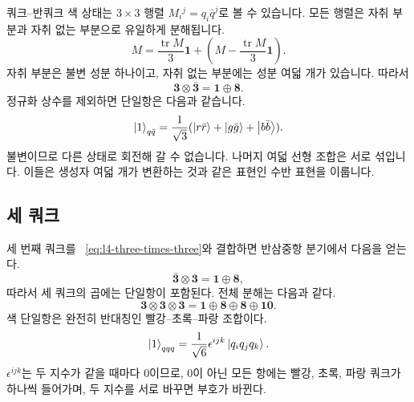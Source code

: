 쿼크--반쿼크 색 상태는 \(3\times3\) 행렬 \(M_i{}^j=q_i\bar q^j\)로 볼 수 있습니다. 모든 행렬은 자취 부분과 자취 없는 부분으로 유일하게 분해됩니다.
\begin{equation}
M=\frac{\operatorname{tr}M}{3}\boldsymbol 1
+\left(M-\frac{\operatorname{tr}M}{3}\boldsymbol 1\right).
\end{equation}
자취 부분은 불변 성분 하나이고, 자취 없는 부분에는 성분 여덟 개가 있습니다. 따라서
\begin{equation}
\boldsymbol 3\otimes\bar{\boldsymbol 3}
=\boldsymbol 1\oplus\boldsymbol 8.
\label{eq:l4-three-times-threebar}
\end{equation}
정규화 상수를 제외하면 단일항은 다음과 같습니다.
\begin{equation}
\left\lvert1\right\rangle_{q\bar q}
=\frac{1}{\sqrt3}
(\left\lvert r\bar r\right\rangle+\left\lvert g\bar g\right\rangle+\left\lvert b\bar b\right\rangle).
\end{equation}
불변이므로 다른 상태로 회전해 갈 수 없습니다. 나머지 여덟 선형 조합은 서로 섞입니다. 이들은 생성자 여덟 개가 변환하는 것과 같은 표현인 수반 표현을 이룹니다.

\subsection{세 쿼크}

세 번째 쿼크를 ~\eqref{eq:l4-three-times-three}와 결합하면 반삼중항 분기에서 다음을 얻는다.
\begin{equation}
\bar{\boldsymbol 3}\otimes\boldsymbol 3
=\boldsymbol 1\oplus\boldsymbol 8,
\end{equation}
따라서 세 쿼크의 곱에는 단일항이 포함된다. 전체 분해는 다음과 같다.
\begin{equation}
\boldsymbol 3\otimes\boldsymbol 3\otimes\boldsymbol 3
=\boldsymbol 1\oplus\boldsymbol 8\oplus\boldsymbol 8
\oplus\boldsymbol{10}.
\label{eq:l4-three-quark-full}
\end{equation}
색 단일항은 완전히 반대칭인 빨강--초록--파랑 조합이다.
\begin{equation}
\left\lvert1\right\rangle_{qqq}
=\frac{1}{\sqrt6}\epsilon^{ijk}\left\lvert q_iq_jq_k\right\rangle.
\label{eq:l4-baryon-singlet}
\end{equation}
\(\epsilon^{ijk}\)는 두 지수가 같을 때마다 0이므로, 0이 아닌 모든 항에는 빨강, 초록, 파랑 쿼크가 하나씩 들어가며, 두 지수를 서로 바꾸면 부호가 바뀐다.

\begin{classroomqa}
\end{classroomqa}

